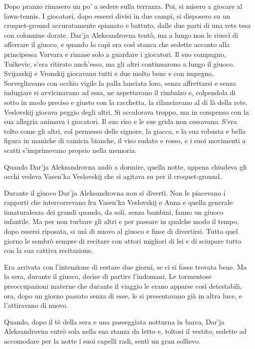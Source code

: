 Dopo pranzo rimasero un po' a sedere sulla terrazza. Poi, si misero a giocare al lawn-tennis. I giocatori, dopo essersi divisi in due campi, si disposero su un croquet-ground accuratamente spianato e battuto, dalle due parti di una rete tesa con colonnine dorate. Dar'ja Aleksandrovna tentò, ma a lungo non le riuscì di afferrare il giuoco, e quando lo capì era così stanca che sedette accanto alla principessa Varvara e rimase solo a guardare i giocatori. Il suo compagno, Tuškevic, s'era ritirato anch'esso, ma gli altri continuarono a lungo il giuoco. Svijazskij e Vronskij giocavano tutti e due molto bene e con impegno. Sorvegliavano con occhio vigile la palla lanciata loro, senza affrettarsi e senza indugiare si avvicinavano ad essa, ne aspettavano il rimbalzo e, colpendola di sotto in modo preciso e giusto con la racchetta, la rilanciavano al di là della rete. Veslovskij giocava peggio degli altri. Si accalorava troppo, ma in compenso con la sua allegria animava i giocatori. Il suo riso e le sue grida non cessavano. S'era tolto come gli altri, col permesso delle signore, la giacca, e la sua robusta e bella figura in maniche di camicia bianche, il viso sudato e rosso, e i suoi movimenti a scatti s'imprimevano proprio nella memoria. 

Quando Dar'ja Aleksandrovna andò a dormire, quella notte, appena chiudeva gli occhi vedeva Vasen'ka Veslovskij che si agitava su per il croquet-ground. 

Durante il giuoco Dar'ja Aleksandrovna non si divertì. Non le piacevano i rapporti che intercorrevano fra Vasen'ka Veslovskij e Anna e quella generale innaturalezza dei grandi quando, da soli, senza bambini, fanno un giuoco infantile. Ma per non turbare gli altri e per passare in qualche modo il tempo, dopo essersi riposata, si unì di nuovo al giuoco e finse di divertirsi. Tutto quel giorno le sembrò sempre di recitare con attori migliori di lei e di sciupare tutto con la sua cattiva recitazione. 

Era arrivata con l'intenzione di restare due giorni, se ci si fosse trovata bene. Ma la sera, durante il giuoco, decise di partire l'indomani. Le tormentose preoccupazioni materne che durante il viaggio le erano apparse così detestabili, ora, dopo un giorno passato senza di esse, le si presentavano già in altra luce, e l'attiravano di nuovo. 

Quando, dopo il tè della sera e una passeggiata notturna in barca, Dar'ja Aleksandrovna entrò sola nella sua stanza da letto e, toltosi il vestito, sedette ad accomodare per la notte i suoi capelli radi, sentì un gran sollievo. 

